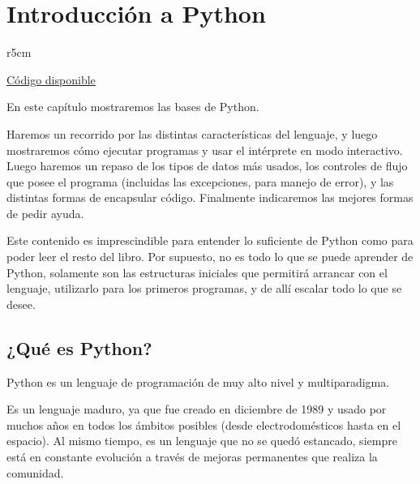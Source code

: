 

\chapter{Introducción a Python} \label{ch:intro}

\begin{wraptable}{r}{5cm}
\begin{modulesinfo}
\begin{center}
{\small
    \href{https://github.com/facundobatista/libro-pyciencia/tree/master/código/intro/}{Código disponible}
}
\end{center}
\end{modulesinfo}
\end{wraptable}

En este capítulo mostraremos las bases de Python. 

Haremos un recorrido por las distintas características del lenguaje, y luego mostraremos cómo ejecutar programas y usar el intérprete en modo interactivo. Luego haremos un repaso de los tipos de datos más usados, los controles de flujo que posee el programa (incluidas las excepciones, para manejo de error), y las distintas formas de encapsular código. Finalmente indicaremos las mejores formas de pedir ayuda.

Este contenido es imprescindible para entender lo suficiente de Python como para poder leer el resto del libro. Por supuesto, no es todo lo que se puede aprender de Python, solamente son las estructuras iniciales que permitirá arrancar con el lenguaje, utilizarlo para los primeros programas, y de allí escalar todo lo que se desee.


\section{¿Qué es Python?}\label{sec:que-es-python}

Python es un lenguaje de programación de muy alto nivel y multiparadigma.

Es un lenguaje maduro, ya que fue creado en diciembre de 1989 y usado por muchos años en todos los ámbitos posibles (desde electrodomésticos hasta en el espacio). Al mismo tiempo, es un lenguaje que no se quedó estancado, siempre está en constante evolución a través de mejoras permanentes que realiza la comunidad.

